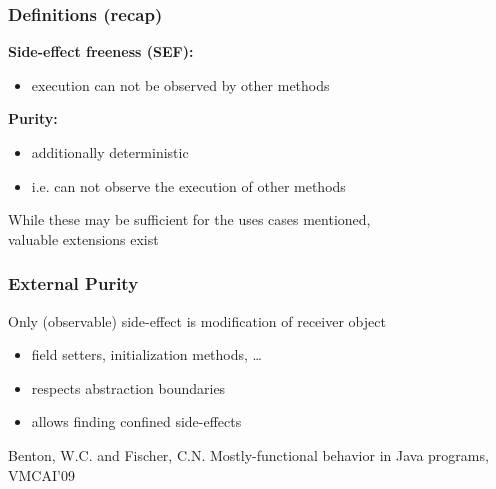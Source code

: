 \documentclass{beamer}
\begin{document}
\begin{frame}
\frametitle{Definitions (recap)}
\vspace{2mm}
\textbf{Side-effect freeness (SEF):}
\begin{itemize}
	\item execution can not be observed by other methods
\end{itemize}
\vspace{2mm}
\textbf{Purity:}
\begin{itemize}
	\item additionally deterministic
	\item i.e. can not observe the execution of other methods
\end{itemize}
\vspace{8mm}
\pause
While these may be sufficient for the uses cases mentioned,\\
valuable extensions exist
\end{frame}

\begin{frame}
\frametitle{External Purity~\cite{MostlyFunctional}}
\vspace{4mm}
\begin{overlayarea}{\textwidth}{0.65\textheight}
Only (observable) side-effect is modification of receiver object
\begin{itemize}
	\item field setters, initialization methods, \dots
	\item respects abstraction boundaries
	\item allows finding confined side-effects
\end{itemize}
\end{overlayarea}

\begin{thebibliography}{99999}
Benton, W.C. and Fischer, C.N. \newblock Mostly-functional behavior in Java programs, \newblock VMCAI'09
\end{thebibliography}
\end{frame}
\end{document}
